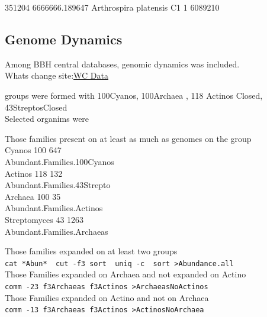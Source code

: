 \documentclass[12pt,twoside]{reedthesis}
\begin{document}
  351204 6666666.189647 Arthrospira platensis C1 1 6089210
  
  \subsection{Genome Dynamics}\label{genome-dynamics}
  
  Among BBH central databases, genomic dynamics was included.\\
  Whats change
  site:\href{http://pubseed.theseed.org/wc.cgi?request=show_otus\&base=/homes/nselem/Data/CS}{WC
  Data}
  
  groups were formed with 100Cyanos, 100Archaea , 118 Actinos Closed,
  43StreptosClosed\\
  Selected organims were
  
  \begin{Shaded}
  \begin{Highlighting}[]
  \StringTok{ }\NormalTok{(}\NormalTok{, } \NormalTok{,}\NormalTok{)}
  \end{Highlighting}
  \end{Shaded}
  
  Those families present on at least as much as genomes on the group\\
  Cyanos 100 647\\
  Abundant.Families.100Cyanos\\
  Actinos 118 132\\
  Abundant.Families.43Strepto\\
  Archaea 100 35\\
  Abundant.Families.Actinos\\
  Streptomyces 43 1263\\
  Abundant.Families.Archaeas
  
  Those families expanded on at least two groups\\
  \texttt{cat\ *Abun*\ \textbar{}\ cut\ -f3\textbar{}\ sort\ \textbar{}\ uniq\ -c\ \textbar{}\ sort\ \textgreater{}Abundance.all}\\
  
  Those Families expanded on Archaea and not expanded on Actino\\
  \texttt{comm\ -23\ f3Archaeas\ f3Actinos\ \textgreater{}ArchaeasNoActinos}\\
  Those Families expanded on Actino and not on Archaea\\
  \texttt{comm\ -13\ f3Archaeas\ f3Actinos\ \textgreater{}ActinosNoArchaea}
  
\end{document}
